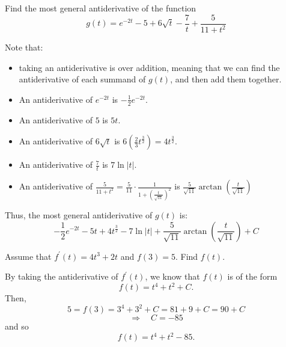 \documentclass[nooutcomes]{ximera}
\begin{document}
\begin{problem}
\begin{enumerate}
		
		
	\end{enumerate}
		
		
		

\end{problem}
	
	
	
	
	
	
	
	
			
			

\begin{problem}
Find the most general antiderivative of the function
$$ g(t) = e^{-2t} - 5 + 6\sqrt{t}-\frac{7}{t} + \frac{5}{11 + t^2} $$
		\begin{freeResponse}
		Note that:
			\begin{itemize}
			\item  taking an antiderivative is  over addition, meaning that we can find the antiderivative of each summand of $g(t)$, and then add them together.
			\item  An antiderivative of $e^{-2t}$ is $-\frac{1}{2} e^{-2t}$.
			\item  An antiderivative of $5$ is $5t$.
			\item  An antiderivative of $6 \sqrt{t}$ is $6 \left( \frac{2}{3} t^{\frac{3}{2}} \right) = 4t^{\frac{3}{2}}$.
			\item  An antiderivative of $\frac{7}{t}$ is $7 \ln |t|$.
			\item  An antiderivative of $\frac{5}{11 + t^2} = \frac{5}{11} \cdot \frac{1}{1 + \left( \frac{t}{\sqrt{11}} \right)^2 }$
			is $\frac{5}{\sqrt{11}} \arctan \left( \frac{t}{\sqrt{11}} \right)$
			\end{itemize}
		Thus, the most general antiderivative of $g(t)$ is:
		$$ -\frac{1}{2} e^{-2t} - 5t + 4t^{\frac{3}{2}} - 7 \ln |t| + \frac{5}{\sqrt{11}} \arctan \left( \frac{t}{\sqrt{11}} \right) + C $$
		\end{freeResponse}
		
		
\end{problem}
















\begin{problem}
Assume that $f^\prime (t) = 4t^3 + 2t$ and $f(3) = 5$.  Find $f(t)$.
		\begin{freeResponse}
		By taking the antiderivative of $f^\prime (t)$, we know that $f(t)$ is of the form
		$$f(t) = t^4 + t^2 + C .$$
		Then,
		$$ 5 = f(3) = 3^4 + 3^2 + C = 81 + 9 + C = 90 + C$$
		$$\Longrightarrow \quad  C = -85 $$
		and so
		$$ f(t) = t^4 + t^2 - 85. $$
		\end{freeResponse}
		
		
		

\end{problem}
\end{document}
